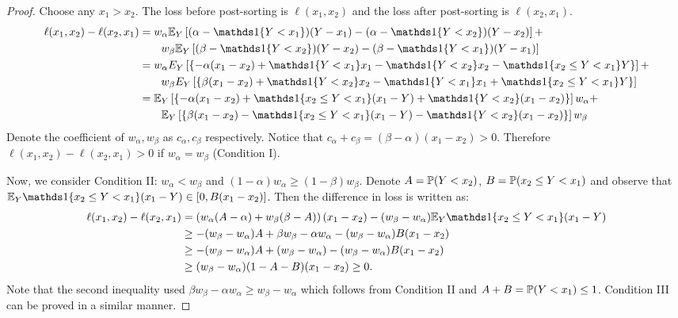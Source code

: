 \begin{proof}
Choose any $x_1 > x_2$. The loss before post-sorting is $\ell(x_1, x_2)$ and the loss after post-sorting is $\ell(x_2, x_1)$. 
\begin{align*}
\ell(x_1, x_2) - \ell(x_2, x_1) 
& = w_\alpha \E_Y \left[(\alpha - \indi{Y < x_1})(Y-x_1) - (\alpha - \indi{Y < x_2})(Y-x_2) \right] + \\ 
& \qquad w_\beta \E_Y \left[(\beta - \indi{Y < x_2})(Y-x_2) - (\beta - \indi{Y < x_1})(Y-x_1) \right] \\
& = w_\alpha E_Y \left[\left\{-\alpha(x_1 - x_2) + \indi{Y < x_1}x_1 - \indi{Y < x_2}x_2 - \indi{x_2 \leq Y < x_1}Y \right\}\right] + \\
& \qquad w_\beta E_Y \left[ \left\{\beta(x_1 - x_2) + \indi{Y < x_2}x_2 - \indi{Y < x_1}x_1 + \indi{x_2 \leq Y < x_1}Y \right\} \right] \\
& = \E_Y \left[\left\{-\alpha(x_1 - x_2) + \indi{x_2 \leq Y < x_1}(x_1 - Y) + \indi{Y < x_2}(x_1 - x_2)\right\} \right] w_\alpha + \\
& \qquad \E_Y \left[\left\{\beta(x_1 - x_2) - \indi{x_2 \leq Y < x_1}(x_1 - Y) - \indi{Y < x_2}(x_1 - x_2)\right\} \right] w_\beta 
\end{align*} 
Denote the coefficient of $w_\alpha, w_\beta$ as $c_\alpha, c_\beta$ respectively. Notice that $c_\alpha + c_\beta = (\beta-\alpha)(x_1 - x_2) > 0$. Therefore $\ell(x_1, x_2) - \ell(x_2, x_1) > 0$ if $w_\alpha = w_\beta$ (Condition I).

Now, we consider Condition II: $w_\alpha < w_\beta$ and $(1-\alpha)w_\alpha \geq (1-\beta)w_\beta$. Denote $A = \P(Y < x_2)$, $B = \P(x_2 \leq Y < x_1)$ and observe that $\E_Y \indi{x_2 \leq Y < x_1}(x_1 - Y) \in [0, B(x_1 - x_2)]$. Then the difference in loss is written as:
\begin{align*}
\ell(x_1, x_2) - \ell(x_2, x_1) 
& = \left(w_\alpha(A-\alpha) + w_\beta(\beta-A)\right)(x_1 - x_2) - (w_\beta - w_\alpha)\E_Y \indi{x_2 \leq Y < x_1}(x_1 - Y) \\
& \geq -(w_\beta - w_\alpha)A + \beta w_\beta - \alpha w_\alpha - (w_\beta - w_\alpha)B(x_1 - x_2) \\
& \geq -(w_\beta - w_\alpha)A + (w_\beta - w_\alpha) - (w_\beta - w_\alpha)B(x_1 - x_2) \\
& \geq (w_\beta - w_\alpha)(1-A-B)(x_1 - x_2) \geq 0.
\end{align*}
Note that the second inequality used $\beta w_\beta - \alpha w_\alpha \geq w_\beta - w_\alpha$ which follows from Condition II and $A+B = \P(Y < x_1) \leq 1$. Condition III can be proved in a similar manner. \smallskip


\end{proof}

